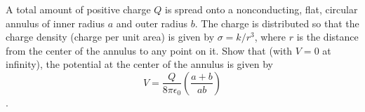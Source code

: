 \documentclass[11pt,letterpaper,boxed]{pset}
\begin{document}
    \begin{problem} [P28.10]
    A total amount of positive charge $Q$ is spread onto a nonconducting, flat, circular annulus of inner radius $a$ and outer radius $b$. The charge is distributed so that the charge density (charge per unit area) is given by $\sigma=k/r^3$, where $r$ is the distance from the center of the annulus to any point on it. Show that (with $V=0$ at infinity), the potential at the center of the annulus is given by $$V=\frac{Q}{8\pi\epsilon_0}(\frac{a+b}{ab})$$.
    \end{problem}
    \newpage
\end{document}
